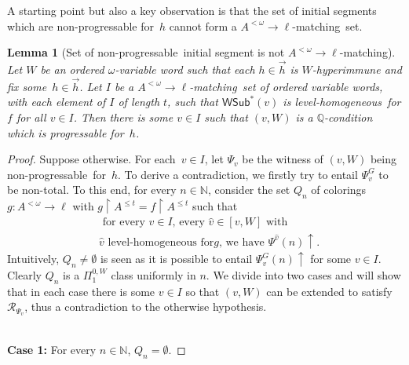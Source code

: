 \documentclass{article}
\def\mcal{\mathcal}
\def\h{\hat}
\def\uhr{\upharpoonright}
\def\wshorter{\mathsf{WSub}^{*}}
\def\sectionallymonochromatic{level-homogeneous}
\def\hjsufficient{$A^{<\omega}\rightarrow\ell$-matching}%
\def\nonprogressable{non-progressable}
\def\QQ{\mathbb{Q}}
\newcommand{\NN}[0]{\mathbb{N}}
\numberwithin{theorem}{section}
\newtheorem{lemma}[theorem]{Lemma}
\theoremstyle{definition}
\begin{document}
A starting point but also a key observation
is that the set of initial segments which are non-progressable for~$h$ cannot form a \hjsufficient\ set.
\begin{lemma}
[Set of \nonprogressable\ initial segment is not \hjsufficient]
\label{scaOVW-lemkey}
 Let $W$ be an ordered $\omega$-variable word such that each $h \in \vec{h}$ is $W$-hyperimmune and fix some~$h \in \vec{h}$.
 Let $I$ be a \hjsufficient\
set of ordered variable words, with each element of $I$ of length
$t$, such that $\wshorter(v)$ is \sectionallymonochromatic\ for
$f$ for all $v\in I$.
Then there is some $v\in I$ such that $(v,W)$ is a $\QQ$-condition which is progressable for~$h$.

\end{lemma}
\begin{proof}
Suppose otherwise. For each~$v \in I$, let $\Psi_v$ be the witness  of
$(v,W)$ being \nonprogressable\ for~$h$.
To derive a contradiction,
we firstly try to  entail $\Psi_v^G$ to be non-total.
To this end, for every $n\in\NN$,
consider the set $Q_n$ of colorings $g:A^{<\omega}\rightarrow\ell$
with $g\uhr A^{\leq t} = f\uhr A^{\leq t}$ such that
\begin{align}\label{scaOVW-defQ}
&\text{ for every $v\in I$,
every $\h v\in [v,W]$ with
}\\ \nonumber
&\text{$\h v$ \sectionallymonochromatic\ for
$g$, we have } \Psi^{\h v}(n)\uparrow.
\end{align}
Intuitively, $Q_n\ne\emptyset$ is seen as it is possible to entail $\Psi_v^G(n)\uparrow$
for some $v\in I$.
Clearly $Q_n$ is a $\Pi_1^{0,W}$ class uniformly in $n$.
We divide into two cases and will show that
in each case there is some $v\in I$ so that $(v,W)$ can be extended to satisfy
$\mcal R_{\Psi_v}$, thus a contradiction to the otherwise hypothesis.

\ \\

\noindent\textbf{Case 1:} For every $n\in\NN$, $Q_n=\emptyset$.



\end{proof}
\end{document}
